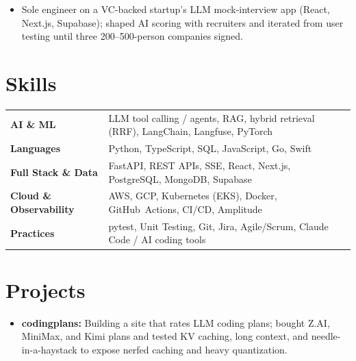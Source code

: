 \documentclass[11pt, letterpaper]{article}
\begin{document}
\vspace{0.5pt}
\begin{itemize}
  \item Sole engineer on a VC-backed startup's LLM mock-interview app (React, Next.js, Supabase); shaped AI scoring with recruiters and iterated from user testing until three 200--500-person companies signed.
\end{itemize}

\section{Skills}
\begin{tabularx}{\textwidth}{@{}l @{\hspace{7pt}} >{\raggedright\arraybackslash}X@{}}
  \textbf{AI \& ML} & LLM tool calling / agents, RAG, hybrid retrieval (RRF), LangChain, Langfuse, PyTorch \\[1pt]
  \textbf{Languages} & Python, TypeScript, SQL, JavaScript, Go, Swift \\[1pt]
  \textbf{Full Stack \& Data} & FastAPI, REST APIs, SSE, React, Next.js, PostgreSQL, MongoDB, Supabase \\[1pt]
  \textbf{Cloud \& Observability} & AWS, GCP, Kubernetes (EKS), Docker, GitHub~Actions, CI/CD, Amplitude \\[1pt]
  \textbf{Practices} & pytest, Unit Testing, Git, Jira, Agile/Scrum, Claude Code / AI coding tools \\
\end{tabularx}

\section{Projects}
\begin{itemize}
  \item \textbf{codingplans:} Building a site that rates LLM coding plans; bought Z.AI, MiniMax, and Kimi plans and tested KV caching, long context, and needle-in-a-haystack to expose nerfed caching and heavy quantization.
\end{itemize}
\end{document}
